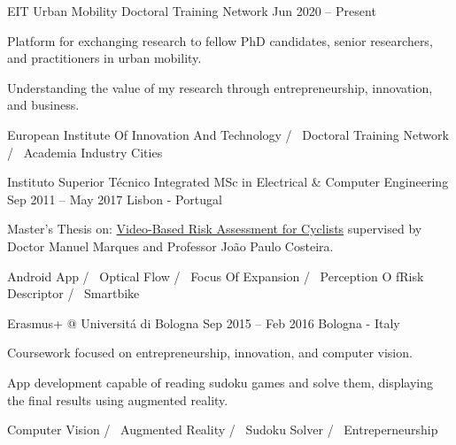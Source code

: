 \begin{cventries}
  \cventryinner
    {EIT Urban Mobility Doctoral Training Network} %
    {Jun 2020 – Present} %
    {} %
    {
      \begin{cvitems} %
        \item {Platform for exchanging research to fellow PhD candidates, senior researchers, and practitioners in urban mobility.}
        \item {Understanding the value of my research through entrepreneurship, innovation, and business.}
      \end{cvitems}
    }
    {
      European Institute Of Innovation And Technology /~
      Doctoral Training Network /~
      Academia Industry Cities ~
    }


  \cventry
    {Instituto Superior Técnico} %
    {Integrated MSc in Electrical \& Computer Engineering} %
    {Sep 2011 – May 2017} %
    {Lisbon - Portugal} %
    {
      \begin{cvitems} %
        \item {Master’s Thesis on: \underline{Video-Based Risk Assessment for Cyclists} supervised by Doctor Manuel Marques and Professor João Paulo Costeira.}
      \end{cvitems}
    }
    {
      Android App /~
      Optical Flow /~
      Focus Of Expansion /~
      Perception O fRisk Descriptor /~
      Smartbike ~
    }

  \cventryinner
    {Erasmus+ @ Universitá di Bologna} %
    {Sep 2015 – Feb 2016} %
    {Bologna - Italy} %
    {
    	\begin{cvitems} %
    		\item {Coursework focused on entrepreneurship, innovation, and computer vision.}
    		\item {App development capable of reading sudoku games and solve them, displaying the final results using augmented reality.}
    	\end{cvitems}
    }
    {
    	Computer Vision /~
    	Augmented Reality /~
    	Sudoku Solver /~
    	Entreperneurship ~   	
    }
 
\end{cventries}
